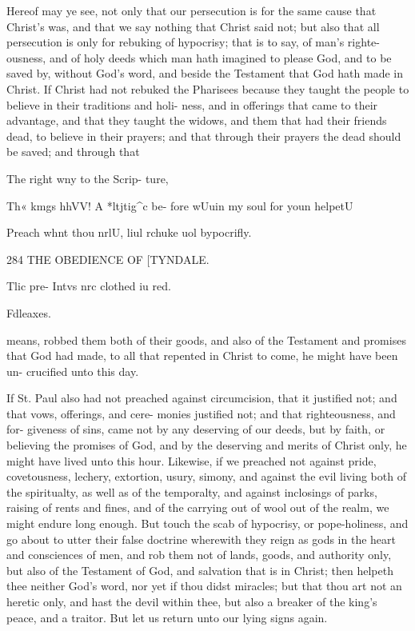 \documentclass{custom}
\begin{document}
{{Hereof may ye see, not only that our persecution is for 
the same cause that Christ's was, and that we say nothing 
that Christ said not; but also that all persecution is only 
for rebuking of hypocrisy; that is to say, of man's righte- 
ousness, and of holy deeds which man hath imagined to 
please God, and to be saved by, without God's word, and 
beside the Testament that God hath made in Christ. 
If Christ had not rebuked the Pharisees because they 
taught the people to believe in their traditions and holi- 
ness, and in offerings that came to their advantage, and 
that they taught the widows, and them that had their 
friends dead, to believe in their prayers; and that through 
their prayers the dead should be saved; and through that 

The right 
wny to 
the Scrip- 
ture, 

Th« kmgs 
hhVV! A 
*ltjtig^c be- 
fore wUuin 
my soul 
for youn 
helpetU 

Preach 
whnt thou 
nrlU, liul 
rchuke uol 
bypocrifly. 


284
THE OBEDIENCE OF
[TYNDALE.

Tlic pre- 
Intvs nrc 
clothed iu 
red. 

Fdleaxes. 

means, robbed them both of their goods, and also of 
the Testament and promises that God had made, to all 
that repented in Christ to come, he might have been un- 
crucified unto this day. 

If St. Paul also had not preached against circumcision, 
that it justified not; and that vows, offerings, and cere- 
monies justified not; and that righteousness, and for- 
giveness of sins, came not by any deserving of our deeds, 
but by faith, or believing the promises of God, and by the 
deserving and merits of Christ only, he might have lived 
unto this hour. Likewise, if we preached not against 
pride, covetousness, lechery, extortion, usury, simony, 
and against the evil living both of the spiritualty, as well 
as of the temporalty, and against inclosings of parks, 
raising of rents and fines, and of the carrying out of wool 
out of the realm, we might endure long enough. But 
touch the scab of hypocrisy, or pope-holiness, and go 
about to utter their false doctrine wherewith they reign as 
gods in the heart and consciences of men, and rob them 
not of lands, goods, and authority only, but also of the 
Testament of God, and salvation that is in Christ; then 
helpeth thee neither God's word, nor yet if thou didst 
miracles; but that thou art not an heretic only, and hast 
the devil within thee, but also a breaker of the king's 
peace, and a traitor. But let us return unto our lying 
signs again. 

}}
\end{document}

